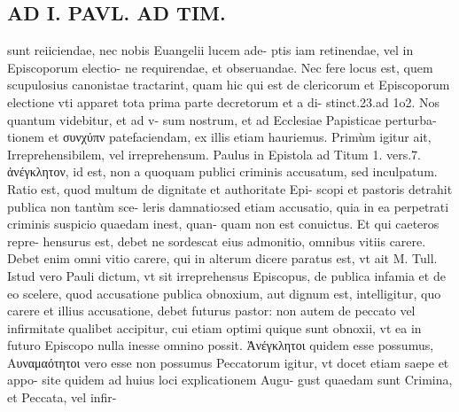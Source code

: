 \documentclass{article}
\begin{document}
\begin{pages}
\section*{AD I. PAVL. AD TIM. }
\marginpar{[ p.102 ]}\pstart sunt reiiciendae, nec nobis Euangelii lucem ade- ptis iam retinendae, vel in Episcoporum electio- ne requirendae, et obseruandae. Nec fere locus est, quem scupulosius canonistae tractarint, quam hic qui est de clericorum et Episcoporum electione vti apparet tota prima parte decretorum et a di- stinct.23.ad 1o2. Nos quantum videbitur, et ad v- sum nostrum, et ad Ecclesiae Papisticae perturba- tionem et συνχύπν patefaciendam, ex illis etiam hauriemus. Primùm igitur ait, Irreprehensibilem, vel irreprehensum. Paulus in Epistola ad Titum 1. vers.7. ἀνέγκλητον, id est, non a quoquam publici criminis accusatum, sed inculpatum. Ratio est, quod multum de dignitate et authoritate Epi- scopi et pastoris detrahit publica non tantùm sce- leris damnatio:sed etiam accusatio, quia in ea perpetrati criminis suspicio quaedam inest, quan- quam non est conuictus. Et qui caeteros repre- hensurus est, debet ne sordescat eius admonitio, omnibus vitiis carere. Debet enim omni vitio carere, qui in alterum dicere paratus est, vt ait M. Tull. Istud vero Pauli dictum, vt sit irreprehensus Episcopus, de publica infamia et de eo scelere, quod accusatione publica obnoxium, aut dignum est, intelligitur, quo carere et illius accusatione, debet futurus pastor: non autem de peccato vel infirmitate qualibet accipitur, cui etiam optimi quique sunt obnoxii, vt ea in futuro Episcopo nulla inesse omnino possit. Ἀνέγκλητοι quidem esse possumus, Αυναμαότητοι vero esse non possumus Peccatorum igitur, vt docet etiam saepe et appo- site quidem ad huius loci explicationem Augu- gust quaedam sunt Crimina, et Peccata, vel infir-  \pend

\end{pages}
\end{document}
